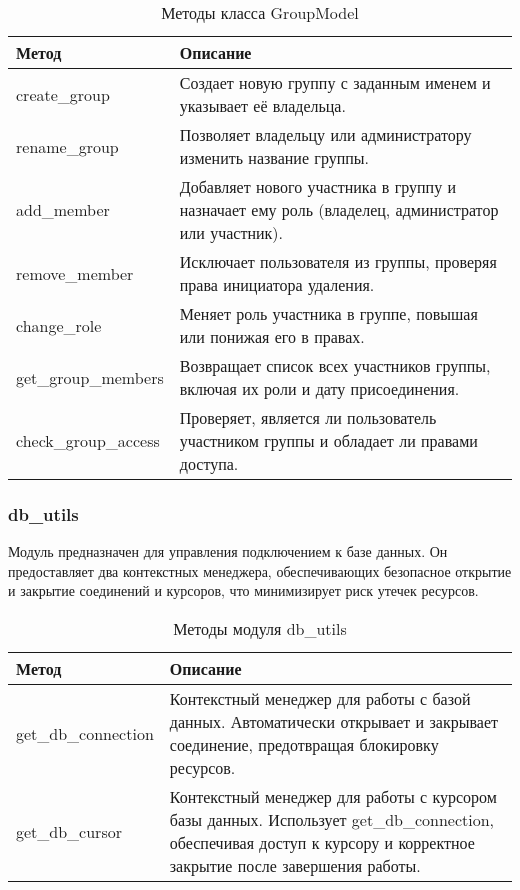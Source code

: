 \begin{xltabular}{\textwidth}{|l|X|}
	\caption{Методы класса GroupModel}\\ \hline
	\centrow Метод & \centrow Описание \\ \hline
	create\_group & Создает новую группу с заданным именем и указывает её владельца. \\ \hline 
	rename\_group & Позволяет владельцу или администратору изменить название группы. \\ \hline 
	add\_member & Добавляет нового участника в группу и назначает ему роль (владелец, администратор или участник). \\ \hline
	remove\_member & Исключает пользователя из группы, проверяя права инициатора удаления. \\ \hline
	change\_role & Меняет роль участника в группе, повышая или понижая его в правах. \\ \hline
	get\_group\_members & Возвращает список всех участников группы, включая их роли и дату присоединения. \\ \hline
	check\_group\_access & Проверяет, является ли пользователь участником группы и обладает ли правами доступа. \\ \hline
\end{xltabular}

\subsubsection{db\_utils}

Модуль предназначен для управления подключением к базе данных. Он предоставляет два контекстных менеджера, обеспечивающих безопасное открытие и закрытие соединений и курсоров, что минимизирует риск утечек ресурсов.

\begin{xltabular}{\textwidth}{|l|X|}
	\caption{Методы модуля db\_utils}\\ \hline
	\centrow Метод & \centrow Описание \\ \hline
	get\_db\_connection & Контекстный менеджер для работы с базой данных. Автоматически открывает и закрывает соединение, предотвращая блокировку ресурсов. \\ \hline
	get\_db\_cursor & Контекстный менеджер для работы с курсором базы данных. Использует get\_db\_connection, обеспечивая доступ к курсору и корректное закрытие после завершения работы. \\ \hline
\end{xltabular}


